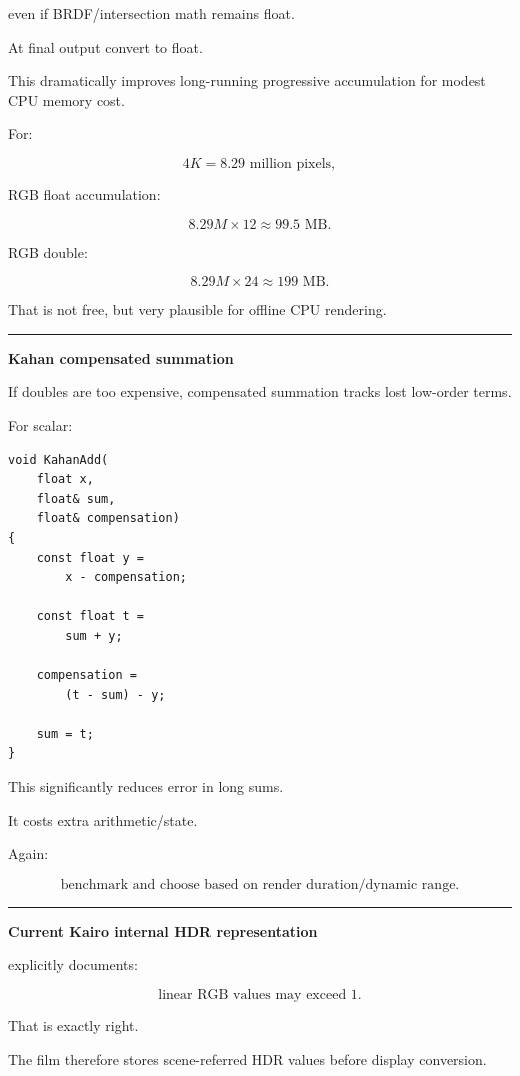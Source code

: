even if BRDF/intersection math remains float.

At final output convert to float.

This dramatically improves long-running progressive accumulation for modest CPU memory cost.

For:

\[
4K
=
8.29\text{ million pixels},
\]

RGB float accumulation:

\[
8.29M\times12
\approx99.5\text{ MB}.
\]

RGB double:

\[
8.29M\times24
\approx199\text{ MB}.
\]

That is not free, but very plausible for offline CPU rendering.

\begin{center}\rule{0.5\linewidth}{0.5pt}\end{center}

\textbf{Kahan compensated summation}

If doubles are too expensive, compensated summation tracks lost low-order terms.

For scalar:

\begin{verbatim}
void KahanAdd(
    float x,
    float& sum,
    float& compensation)
{
    const float y =
        x - compensation;

    const float t =
        sum + y;

    compensation =
        (t - sum) - y;

    sum = t;
}
\end{verbatim}

This significantly reduces error in long sums.

It costs extra arithmetic/state.

Again:

\[
\boxed{\text{benchmark and choose based on render duration/dynamic range}.}
\]

\begin{center}\rule{0.5\linewidth}{0.5pt}\end{center}

\textbf{Current Kairo internal HDR representation}

 explicitly documents:

\[
\boxed{\text{linear RGB values may exceed }1.}
\]

That is exactly right.

The film therefore stores scene-referred HDR values before display conversion.

